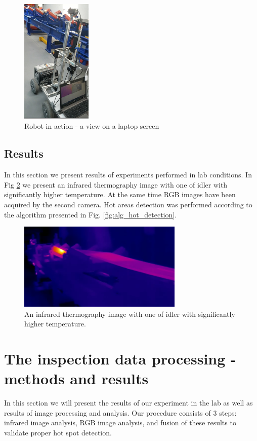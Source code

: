 \documentclass[3p,times,12pt]{elsarticle}
\begin{document}
\begin{figure}[ht!]
	\centering
	\includegraphics[width=0.3\textwidth]{measurement2.jpg}
	\caption{Robot in action - a view on a laptop screen}
	\label{fig:robot_action}
\end{figure}

\subsection{Results}
In this section we present results of experiments performed in lab conditions. In Fig \ref{fig:hot_idler} we present an infrared thermography image with one of idler with significantly higher temperature. At the same time RGB images have been acquired by the second camera. Hot areas detection was performed according to the algorithm presented in Fig. \ref{fig:alg_hot_detection}.



\begin{figure}[ht!]
	\centering
	\includegraphics[width=0.7\textwidth]{hot_idler.png}
	\caption{An infrared thermography image with one of idler with significantly higher temperature.}
	\label{fig:hot_idler}
\end{figure}


\section{The inspection data processing - methods and results}
In this section we will present the results of our experiment in the lab as well as results of image processing and analysis. Our procedure consists of 3 steps: infrared image analysis, RGB image analysis, and fusion of these results to validate proper hot spot detection. 
\end{document}
